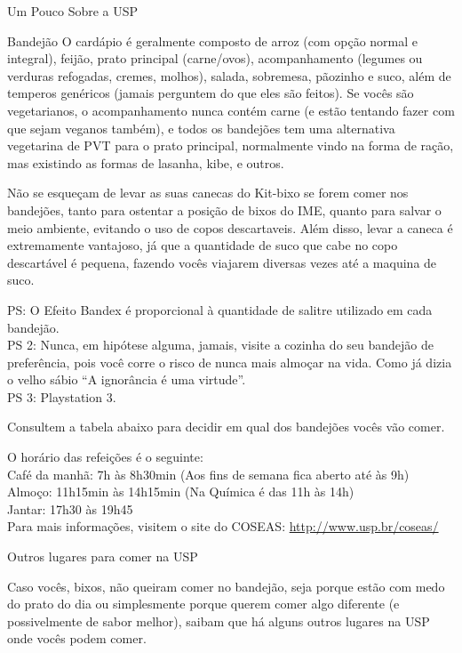 \begin{secao}{Um Pouco Sobre a USP}
\begin{subsecao}{Bandejão}
O cardápio é geralmente composto de arroz (com opção normal e integral), feijão,
prato principal (carne/ovos), acompanhamento (legumes ou verduras refogadas,
cremes, molhos), salada, sobremesa, pãozinho e suco, além de temperos genéricos
(jamais perguntem do que eles são feitos). Se vocês são vegetarianos, o
acompanhamento nunca contém carne (e estão tentando fazer com que sejam veganos
também), e todos os bandejões tem uma alternativa vegetarina de PVT para o
prato principal, normalmente vindo na forma de ração, mas existindo as formas
de lasanha, kibe, e outros.


Não se esqueçam de levar as suas canecas do Kit-bixo se forem comer nos bandejões,
tanto para ostentar a posição de bixos do IME, quanto para salvar o meio ambiente,
evitando o uso de copos descartaveis. Além disso, levar a caneca é extremamente
vantajoso, já que a quantidade de suco que cabe no copo descartável é pequena,
fazendo vocês viajarem diversas vezes até a maquina de suco.


PS: O Efeito Bandex é proporcional à quantidade de salitre utilizado em cada bandejão.\\
PS 2: Nunca, em hipótese alguma, jamais, visite a cozinha do seu bandejão de preferência,
pois você corre o risco de nunca mais almoçar na vida. Como já dizia o velho sábio ``A
ignorância é uma virtude''.\\
PS 3: Playstation 3.

Consultem a tabela abaixo para decidir em qual dos bandejões vocês vão comer.

O horário das refeições é o seguinte:\\
Café da manhã: 7h às 8h30min (Aos fins de semana fica aberto até às 9h)\\
Almoço: 11h15min às 14h15min (Na Química é das 11h às 14h)\\
Jantar: 17h30 às 19h45\\

Para mais informações, visitem o site do COSEAS: \href{http://www.usp.br/coseas/COSEASHP/COSEAS2010_restaurantes.html}{http://www.usp.br/coseas/}
\pagebreak

\end{subsecao}

\begin{subsecao}{Outros lugares para comer na USP}

Caso vocês, bixos, não queiram comer no bandejão, seja porque estão com medo do prato do dia
ou simplesmente porque querem comer algo diferente (e possivelmente de sabor melhor), saibam
que há alguns outros lugares na USP onde vocês podem comer.


\end{subsecao}
\end{secao}

